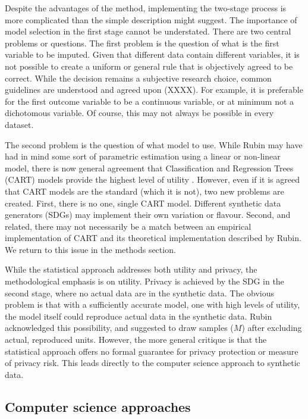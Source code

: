 \documentclass[runningheads]{llncs}
\begin{document}
Despite the advantages of the method, implementing the two-stage process is more complicated than the simple description might suggest.  The importance of model selection in the first stage cannot be understated.  There are two central problems or questions.  The first problem is the question of what is the first variable to be imputed.  Given that different data contain different variables, it is not possible to create a uniform or general rule that is objectively agreed to be correct.  While the decision remains a subjective research choice, common guidelines are understood and agreed upon (XXXX).  For example, it is preferable for the first outcome variable to be a continuous variable, or at minimum not a dichotomous variable.  Of course, this may not always be possible in every dataset.  

The second problem is the question of what model to use.  While Rubin may have had in mind some sort of parametric estimation using a linear or non-linear model, there is now general agreement that Classification and Regression Trees (CART) models provide the highest level of utility \citep{drechsler2011empirical}.  However, even if it is agreed that CART models are the standard (which it is not), two new problems are created.  First, there is no one, single CART model.  Different synthetic data generators (SDGs) may implement their own variation or flavour.  Second, and related, there may not necessarily be a match between an empirical implementation of CART and its theoretical implementation described by Rubin.  We return to this issue in the methods section.

While the statistical approach addresses both utility and privacy, the methodological emphasis is on utility.  Privacy is achieved by the SDG in the second stage, where no actual data are in the synthetic data.  The obvious problem is that with a sufficiently accurate model, one with high levels of utility, the model itself could reproduce actual data in the synthetic data.  Rubin \cite{rubin1993statistical} acknowledged this possibility, and suggested to draw samples ($M$) after excluding actual, reproduced units.  However, the more general critique is that the statistical approach offers no formal guarantee for privacy protection or measure of privacy risk.  This leads directly to the computer science approach to synthetic data.

\subsection{Computer science approaches}
\end{document}
